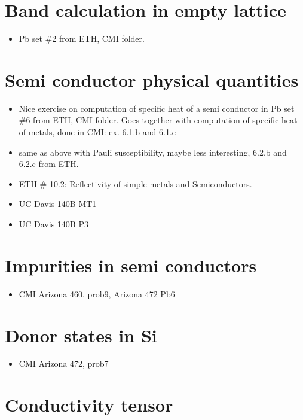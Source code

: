 \section{Band calculation in empty lattice}

\begin{itemize}
\item Pb set \#2 from ETH, CMI folder.
\end{itemize}

\section{Semi conductor physical quantities}

\begin{itemize}
\item Nice exercise on computation of specific heat of a semi
  conductor in Pb set \#6 from ETH, CMI folder. Goes together with
  computation of specific heat of metals, done in CMI: ex. 6.1.b and
  6.1.c
\item same as above with Pauli susceptibility, maybe less interesting,
  6.2.b and 6.2.c from ETH.
\item ETH \# 10.2: Reflectivity of simple metals and Semiconductors.
\item UC Davis 140B MT1
\item UC Davis 140B P3
\end{itemize}

\section{Impurities in semi conductors}

\begin{itemize}
\item CMI Arizona 460, prob9, Arizona 472 Pb6
\end{itemize}

\section{Donor states in Si}

\begin{itemize}
\item CMI Arizona 472, prob7
\end{itemize}


\section{Conductivity tensor}

